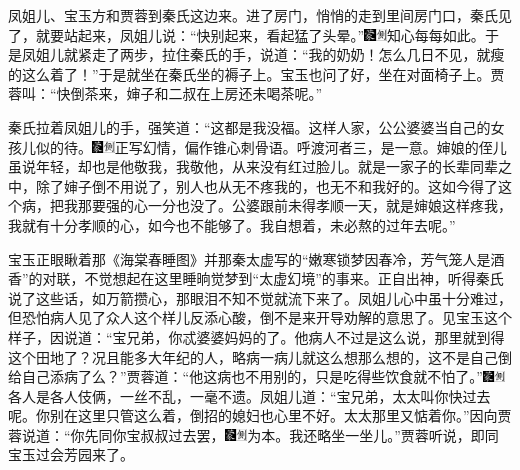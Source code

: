 凤姐儿、宝玉方和贾蓉到秦氏这边来。进了房门，悄悄的走到里间房门口，秦氏见了，就要站起来，凤姐儿说：``快别起来，看起猛了头晕。''{\includegraphics[width=3mm]{../Images/00006}\includegraphics[width=3mm]{../Images/00011}\footnotesize \kaishu 知心每每如此。}于是凤姐儿就紧走了两步，拉住秦氏的手，说道：``我的奶奶！怎么几日不见，就瘦的这么着了！''于是就坐在秦氏坐的褥子上。宝玉也问了好，坐在对面椅子上。贾蓉叫：``快倒茶来，婶子和二叔在上房还未喝茶呢。''

秦氏拉着凤姐儿的手，强笑道：``这都是我没福。这样人家，公公婆婆当自己的女孩儿似的待。{\includegraphics[width=3mm]{../Images/00006}\includegraphics[width=3mm]{../Images/00011}\footnotesize \kaishu 正写幻情，偏作锥心刺骨语。呼渡河者三，是一意。}婶娘的侄儿虽说年轻，却也是他敬我，我敬他，从来没有红过脸儿。就是一家子的长辈同辈之中，除了婶子倒不用说了，别人也从无不疼我的，也无不和我好的。这如今得了这个病，把我那要强的心一分也没了。公婆跟前未得孝顺一天，就是婶娘这样疼我，我就有十分孝顺的心，如今也不能够了。我自想着，未必熬的过年去呢。''

宝玉正眼瞅着那《海棠春睡图》并那秦太虚写的``嫩寒锁梦因春冷，芳气笼人是酒香''的对联，不觉想起在这里睡晌觉梦到``太虚幻境''的事来。正自出神，听得秦氏说了这些话，如万箭攒心，那眼泪不知不觉就流下来了。凤姐儿心中虽十分难过，但恐怕病人见了众人这个样儿反添心酸，倒不是来开导劝解的意思了。见宝玉这个样子，因说道：``宝兄弟，你忒婆婆妈妈的了。他病人不过是这么说，那里就到得这个田地了？况且能多大年纪的人，略病一病儿就这么想那么想的，这不是自己倒给自己添病了么？''贾蓉道：``他这病也不用别的，只是吃得些饮食就不怕了。''{\includegraphics[width=3mm]{../Images/00006}\includegraphics[width=3mm]{../Images/00011}\footnotesize \kaishu 各人是各人伎俩，一丝不乱，一毫不遗。}凤姐儿道：``宝兄弟，太太叫你快过去呢。你别在这里只管这么着，倒招的媳妇也心里不好。太太那里又惦着你。''因向贾蓉说道：``你先同你宝叔叔过去罢，{\includegraphics[width=3mm]{../Images/00006}\includegraphics[width=3mm]{../Images/00011}\footnotesize \kaishu 为本。}我还略坐一坐儿。''贾蓉听说，即同宝玉过会芳园来了。

